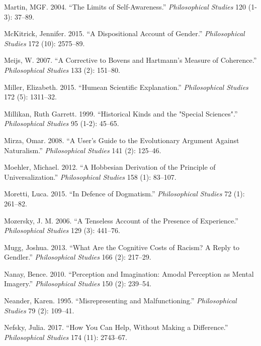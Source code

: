 \documentclass[
  10pt,
  letterpaper,
  DIV=11,
  numbers=noendperiod,
  twoside]{scrartcl}
\newlength{\cslhangindent}
\newenvironment{CSLReferences}[2] %
 {\begin{list}{}{%
  \setlength{\itemindent}{0pt}
  \setlength{\leftmargin}{0pt}
  \setlength{\parsep}{0pt}
  \ifodd #1
   \setlength{\leftmargin}{\cslhangindent}
   \setlength{\itemindent}{-1\cslhangindent}
  \fi
  \setlength{\itemsep}{#2\baselineskip}}}
 {\end{list}}
\begin{document}
\begin{CSLReferences}{1}{0}
Martin, MGF. 2004. {``The Limits of Self-Awareness.''}
\emph{Philosophical Studies} 120 (1-3): 37--89.

McKitrick, Jennifer. 2015. {``A Dispositional Account of Gender.''}
\emph{Philosophical Studies} 172 (10): 2575--89.

Meijs, W. 2007. {``A Corrective to Bovens and Hartmann's Measure of
Coherence.''} \emph{Philosophical Studies} 133 (2): 151--80.

Miller, Elizabeth. 2015. {``Humean Scientific Explanation.''}
\emph{Philosophical Studies} 172 (5): 1311--32.

Millikan, Ruth Garrett. 1999. {``Historical Kinds and the "Special
Sciences".''} \emph{Philosophical Studies} 95 (1-2): 45--65.

Mirza, Omar. 2008. {``A User's Guide to the Evolutionary Argument
Against Naturalism.''} \emph{Philosophical Studies} 141 (2): 125--46.

Moehler, Michael. 2012. {``A Hobbesian Derivation of the Principle of
Universalization.''} \emph{Philosophical Studies} 158 (1): 83--107.

Moretti, Luca. 2015. {``In Defence of Dogmatism.''} \emph{Philosophical
Studies} 72 (1): 261--82.

Mozersky, J. M. 2006. {``A Tenseless Account of the Presence of
Experience.''} \emph{Philosophical Studies} 129 (3): 441--76.

Mugg, Joshua. 2013. {``What Are the Cognitive Costs of Racism? A Reply
to Gendler.''} \emph{Philosophical Studies} 166 (2): 217--29.

Nanay, Bence. 2010. {``Perception and Imagination: Amodal Perception as
Mental Imagery.''} \emph{Philosophical Studies} 150 (2): 239--54.

Neander, Karen. 1995. {``Misrepresenting and Malfunctioning.''}
\emph{Philosophical Studies} 79 (2): 109--41.

Nefsky, Julia. 2017. {``How You Can Help, Without Making a
Difference.''} \emph{Philosophical Studies} 174 (11): 2743--67.


\end{CSLReferences}
\end{document}
